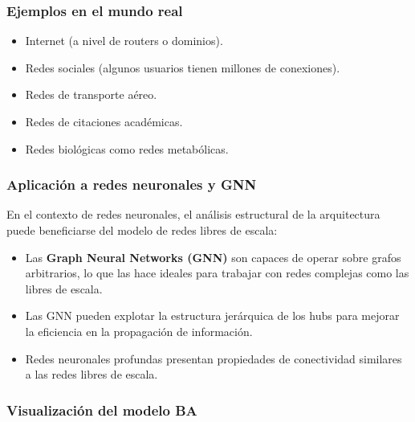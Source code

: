 \subsubsection*{Ejemplos en el mundo real}

\begin{itemize}
    \item Internet (a nivel de routers o dominios).
    \item Redes sociales (algunos usuarios tienen millones de conexiones).
    \item Redes de transporte aéreo.
    \item Redes de citaciones académicas.
    \item Redes biológicas como redes metabólicas.
\end{itemize}

\subsubsection*{Aplicación a redes neuronales y GNN}

En el contexto de redes neuronales, el análisis estructural de la arquitectura puede beneficiarse del modelo de redes libres de escala:

\begin{itemize}
    \item Las \textbf{Graph Neural Networks (GNN)} son capaces de operar sobre grafos arbitrarios, lo que las hace ideales para trabajar con redes complejas como las libres de escala.
    \item Las GNN pueden explotar la estructura jerárquica de los hubs para mejorar la eficiencia en la propagación de información.
    \item Redes neuronales profundas presentan propiedades de conectividad similares a las redes libres de escala.
\end{itemize}

\subsubsection*{Visualización del modelo BA}

\begin{center}
\end{center}

